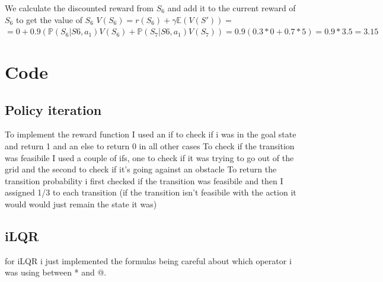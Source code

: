 \documentclass[10pt,a4paper]{article}
\begin{document}
We calculate the discounted reward from $S_{6}$ and add it to the current reward of $S_{6}$ to get the value of $S_{6}$
$ V(S_{6}) = r(S_{6}) + \gamma \mathbb{E}(V(S')) =  $\newline
$= 0 + 0.9 (\mathbb{P}(S_{6}|S{6,a_{1}}) V(S_{6}) + \mathbb{P}(S_{7}|S{6,a_{1}}) V(S_{7}) ) = 0.9(0.3 *0 + 0.7 * 5 ) = 0.9 * 3.5 = 3.15 $
\newpage
\section*{Code}

\subsection*{Policy iteration}
To implement the reward function I used an if to check if i was in the goal state and return 1 and an else to return 0 in all other cases
\newline
To check if the transition was feasibile I used a couple of ifs, one to check if it was trying to go out of the grid and the second to check if it's going against an obstacle 
\newline
To return the transition probability i first checked if the transition was feasibile and then I assigned 1/3 to each transition (if the transition isn't feasibile with the action it would would just remain the state it was)
\newpage
\subsection*{iLQR}
for iLQR i just implemented the formulas being careful about which operator i was using between * and @.
\end{document}
